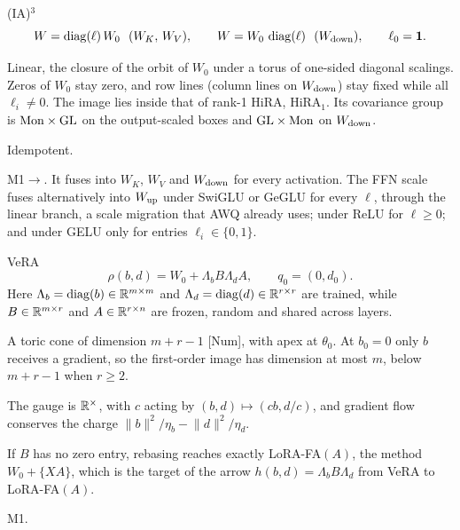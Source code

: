 \begin{example*}{(IA)$^3$}\label{ex:ia3}%
\[
  W=\operatorname{diag}(\ell)\,W_0\ \ (W_K,\,W_V),\qquad W=W_0\,\operatorname{diag}(\ell)\ \ (W_{\rm down}),\qquad \ell_0=\mathbf 1.
\]
\begin{exVIIlines}
\item[Image] Linear, the closure of the orbit of $W_0$ under a torus of one-sided diagonal scalings. Zeros of $W_0$
  stay zero, and row lines (column lines on $W_{\rm down}$) stay fixed while all $\ell_i\ne0$. The image lies inside
  that of rank-1 HiRA, $\mathrm{HiRA}_1$. Its covariance group is $\mathrm{Mon}\times\mathrm{GL}$ on the output-scaled boxes
  and $\mathrm{GL}\times\mathrm{Mon}$ on $W_{\rm down}$.
\item[Base] Idempotent.
\item[Merge] M1$\to$. It fuses into $W_K$, $W_V$ and $W_{\rm down}$ for every activation. The FFN scale fuses
  alternatively into $W_{\rm up}$ under SwiGLU or GeGLU for every $\ell$, through the linear branch, a scale migration
  that AWQ already uses; under ReLU for $\ell\ge0$; and under GELU only for entries $\ell_i\in\{0,1\}$.
\end{exVIIlines}
\end{example*}

\begin{example*}{VeRA}\label{ex:vera}%
\[
  \rho(b,d)=W_0+\Lambda_bB\Lambda_dA,\qquad q_0=(0,d_0).
\]
Here $\Lambda_b=\operatorname{diag}(b)\in\mathbb{R}^{m\times m}$ and $\Lambda_d=\operatorname{diag}(d)\in\mathbb{R}^{r\times r}$ are trained, while
$B\in\mathbb{R}^{m\times r}$ and $A\in\mathbb{R}^{r\times n}$ are frozen, random and shared across layers.
\begin{exVIIlines}
\item[Image] A toric cone of dimension $m+r-1$ [Num], with apex at $\theta_0$. At $b_0=0$ only $b$ receives a
  gradient, so the first-order image has dimension at most $m$, below $m+r-1$ when $r\ge2$.
\item[Fibre] The gauge is $\mathbb{R}^\times$, with $c$ acting by $(b,d)\mapsto(cb,d/c)$, and gradient flow conserves the
  charge $\lVert b\rVert^2/\eta_b-\lVert d\rVert^2/\eta_d$.
\item[Base] If $B$ has no zero entry, rebasing reaches exactly LoRA-FA$(A)$, the method $W_0+\{XA\}$, which is the
  target of the arrow $h(b,d)=\Lambda_bB\Lambda_d$ from VeRA to LoRA-FA$(A)$.
\item[Merge] M1.
\end{exVIIlines}
\end{example*}

